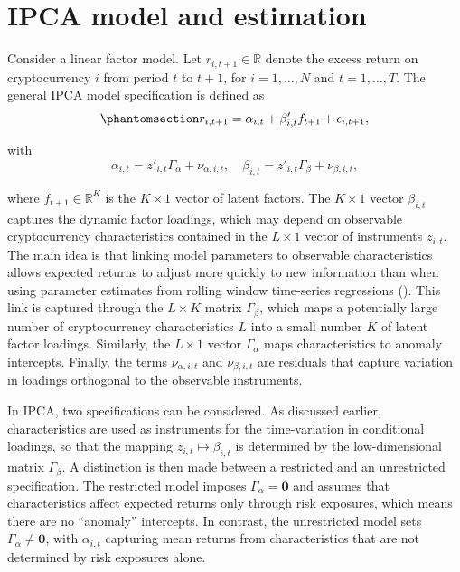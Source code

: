 \documentclass[
  12pt,
  a4paper,
  openany]{scrbook}
\begin{document}
\section{IPCA model and estimation}\label{ipca-model-and-estimation}

Consider a linear factor model. Let \(r_{i,t+1} \in \mathbb{R}\) denote
the excess return on cryptocurrency \(i\) from period \(t\) to \(t+1\),
for \(i = 1, \dots, N\) and \(t = 1, \dots, T\). The general IPCA model
specification is defined as
\begin{equation}\phantomsection\label{eq-ipca}{
r_{i,t+1} = \alpha_{i,t} + \beta_{i,t}' f_{t+1} + \epsilon_{i,t+1},
}\end{equation}

with \[
\alpha_{i,t} = z'_{i,t}\Gamma_\alpha + \nu_{\alpha,i,t}, \quad 
\beta_{i,t} = z'_{i,t}\Gamma_\beta + \nu_{\beta,i,t},
\]

where \(f_{t+1} \in \mathbb{R}^K\) is the \(K \times 1\) vector of
latent factors. The \(K \times 1\) vector \(\beta_{i,t}\) captures the
dynamic factor loadings, which may depend on observable cryptocurrency
characteristics contained in the \(L \times 1\) vector of instruments
\(z_{i,t}\). The main idea is that linking model parameters to
observable characteristics allows expected returns to adjust more
quickly to new information than when using parameter estimates from
rolling window time-series regressions
(). This link is captured through the \(L \times K\) matrix
\(\Gamma_\beta\), which maps a potentially large number of
cryptocurrency characteristics \(L\) into a small number \(K\) of latent
factor loadings. Similarly, the \(L \times 1\) vector \(\Gamma_\alpha\)
maps characteristics to anomaly intercepts. Finally, the terms
\(\nu_{\alpha, i, t}\) and \(\nu_{\beta, i, t}\) are residuals that
capture variation in loadings orthogonal to the observable instruments.

In IPCA, two specifications can be considered. As discussed earlier,
characteristics are used as instruments for the time-variation in
conditional loadings, so that the mapping
\(z_{i,t} \mapsto \beta_{i,t}\) is determined by the low-dimensional
matrix \(\Gamma_\beta\). A distinction is then made between a restricted
and an unrestricted specification. The restricted model imposes
\(\Gamma_\alpha = \mathbf{0}\) and assumes that characteristics affect
expected returns only through risk exposures, which means there are no
``anomaly'' intercepts. In contrast, the unrestricted model sets
\(\Gamma_\alpha \neq \mathbf{0}\), with \(\alpha_{i,t}\) capturing mean
returns from characteristics that are not determined by risk exposures
alone.
\end{document}
